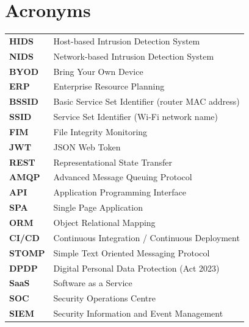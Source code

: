 \documentclass[12pt,a4paper]{report}
\begin{document}
\vspace{300pt}
\tableofcontents
\listoffigures
\listoftables

\chapter*{Acronyms}

\begin{tabular}{ll}
  \textbf{HIDS}     & Host-based Intrusion Detection System \\
  \textbf{NIDS}     & Network-based Intrusion Detection System \\
  \textbf{BYOD}     & Bring Your Own Device \\
  \textbf{ERP}      & Enterprise Resource Planning \\
  \textbf{BSSID}    & Basic Service Set Identifier (router MAC address) \\
  \textbf{SSID}     & Service Set Identifier (Wi-Fi network name) \\
  \textbf{FIM}      & File Integrity Monitoring \\
  \textbf{JWT}      & JSON Web Token \\
  \textbf{REST}     & Representational State Transfer \\
  \textbf{AMQP}     & Advanced Message Queuing Protocol \\
  \textbf{API}      & Application Programming Interface \\
  \textbf{SPA}      & Single Page Application \\
  \textbf{ORM}      & Object Relational Mapping \\
  \textbf{CI/CD}    & Continuous Integration / Continuous Deployment \\
  \textbf{STOMP}    & Simple Text Oriented Messaging Protocol \\
  \textbf{DPDP}     & Digital Personal Data Protection (Act 2023) \\
  \textbf{SaaS}     & Software as a Service \\
  \textbf{SOC}      & Security Operations Centre \\
  \textbf{SIEM}     & Security Information and Event Management \\

\end{tabular}
\end{document}
